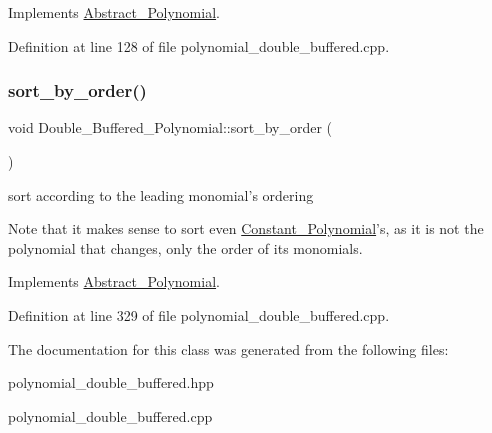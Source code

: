 Implements \hyperlink{class_abstract___polynomial_ad783804725a64f09fff6eeec058afe98}{Abstract\+\_\+\+Polynomial}.



Definition at line 128 of file polynomial\+\_\+double\+\_\+buffered.\+cpp.

\mbox{\label{class_double___buffered___polynomial_a0e7acad01d5ade31b60fe5453d48fdb5}} 
\subsubsection{\texorpdfstring{sort\+\_\+by\+\_\+order()}{sort\_by\_order()}}
{\footnotesize\ttfamily void Double\+\_\+\+Buffered\+\_\+\+Polynomial\+::sort\+\_\+by\+\_\+order (\begin{DoxyParamCaption}{ }\end{DoxyParamCaption})\hspace{0.3cm}{\ttfamily [virtual]}}



sort according to the leading monomial's ordering 

Note that it makes sense to sort even \hyperlink{class_constant___polynomial}{Constant\+\_\+\+Polynomial}'s, as it is not the polynomial that changes, only the order of its monomials. 

Implements \hyperlink{class_abstract___polynomial_a1fcdd29c324c660ea935197c39e682f2}{Abstract\+\_\+\+Polynomial}.



Definition at line 329 of file polynomial\+\_\+double\+\_\+buffered.\+cpp.



The documentation for this class was generated from the following files\+:\begin{DoxyCompactItemize}
\item 
polynomial\+\_\+double\+\_\+buffered.\+hpp\item 
polynomial\+\_\+double\+\_\+buffered.\+cpp\end{DoxyCompactItemize}
